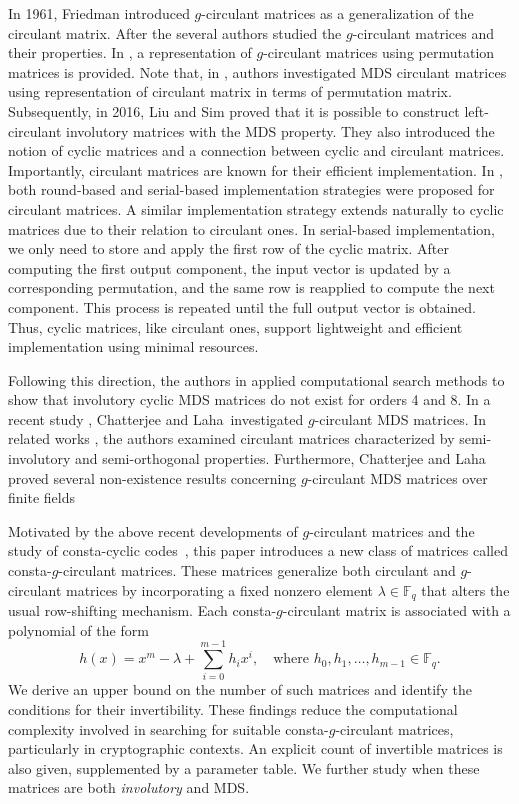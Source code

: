 \documentclass[12pt]{article}
\begin{document}
 In 1961, Friedman \cite{friedman1961eigenvalues} introduced $g$-circulant matrices as a generalization of the circulant matrix. After the several authors \cite{ablow1963roots,Davis1979Circulant, friedman1961eigenvalues} studied the $g$-circulant matrices and their properties. In \cite{friedman1961eigenvalues}, a representation of $g$-circulant matrices using permutation matrices is provided. Note that, in \cite{gupta2015cryptographically}, authors investigated MDS circulant matrices using representation of circulant matrix in terms of permutation matrix. Subsequently, in 2016, Liu and Sim proved that it is possible to construct left-circulant involutory matrices with the MDS property. They also introduced the notion of cyclic matrices and a connection between cyclic and circulant matrices. Importantly, circulant matrices are known for their efficient implementation. In \cite{liu2016lightweight}, both round-based and serial-based implementation strategies were proposed for circulant matrices. A similar implementation strategy extends naturally to cyclic matrices due to their relation to circulant ones. In serial-based implementation, we only need to store and apply the first row of the cyclic matrix. After computing the first output component, the input vector is updated by a corresponding permutation, and the same row is reapplied to compute the next component. This process is repeated until the full output vector is obtained. Thus, cyclic matrices, like circulant ones, support lightweight and efficient implementation using minimal resources.

Following this direction, the authors in \cite{liu2016lightweight} applied computational search methods to show that involutory cyclic MDS matrices do not exist for orders 4 and 8. In a recent study \cite{Chatterjee2024OnMDS}, Chatterjee and Laha\ investigated 
$g$-circulant MDS matrices. In related works \cite{Chatterjee2024ANoteonMDS2, Chatterjee2024ACharacterization}, the authors examined circulant matrices characterized by semi-involutory and semi-orthogonal properties. Furthermore, Chatterjee and Laha \cite{Chatterjee2024Anote} proved several non-existence results concerning 
$g$-circulant MDS matrices over finite fields

Motivated by the above recent developments of $g$-circulant matrices and the study of consta-cyclic codes~\cite{Bakshi2012Aclass}, this paper introduces a new class of matrices called consta-$g$-circulant matrices. These matrices generalize both circulant and $g$-circulant matrices by incorporating a fixed nonzero element $\lambda \in \mathbb{F}_q$ that alters the usual row-shifting mechanism. Each consta-$g$-circulant matrix is associated with a polynomial of the form
\[
h(x) = x^m - \lambda + \sum_{i=0}^{m-1} h_i x^i, \quad \text{where } h_0, h_1, \dots, h_{m-1} \in \mathbb{F}_q.
\]
We derive an upper bound on the number of such matrices and identify the conditions for their invertibility. These findings reduce the computational complexity involved in searching for suitable consta-$g$-circulant  matrices, particularly in cryptographic contexts. An explicit count of invertible matrices is also given, supplemented by a parameter table. We further study when these matrices are both \emph{involutory} and  MDS. 
\end{document}
